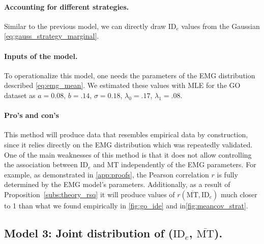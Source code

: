 \documentclass[acmlarge, manuscript,review]{acmart}
\newcommand{\mmt}{\ensuremath{\overline{\mt}}\xspace}
\newcommand{\mt}{\ensuremath{{\text{MT}}}\xspace}
\newcommand{\ide}{\ensuremath{{\text{ID}_e}}\xspace}
\begin{document}
\paragraph{Accounting for different strategies.} Similar to the previous model, we can directly draw \ide values from the Gaussian \autoref{eq:gauss_strategy_marginal}.%

\paragraph{Inputs of the model.} To operationalize this model, one needs the parameters of the EMG distribution described \autoref{eq:emg_mean}. We estimated these values with MLE for the GO dataset as $a = 0.08$, $b = .14$, $\sigma=0.18$, $\lambda_0 = .17$, $\lambda_1 = .08$. 

\paragraph{Pro's and con's} This method will produce data that resembles empirical data by construction, since it relies directly on the EMG distribution which was repeatedly validated. One of the main weaknesses of this method is that it does not allow controlling the association between \ide and MT independently of the EMG parameters. For example, as demonstrated in \autoref{app:proofs}, the Pearson correlation $r$ is fully determined by the EMG model's parameters. Additionally, as a result of Proposition~\ref{subs:theory_rsq} it will produce values of $r(\mmt, \ide)$ much closer to 1 than what we found empirically in \autoref{fig:go_ide} and in\autoref{fig:meancov_strat}.

\subsection{Model 3: Joint distribution of (\ide, \mmt).}
\end{document}
